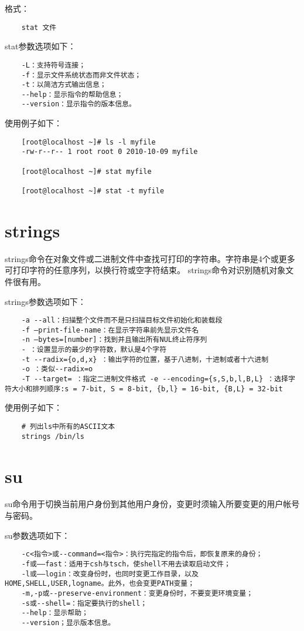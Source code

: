 \documentclass[a4paper,left=2.5cm,right=2.5cm,11pt]{article}
\begin{document}
	格式：
	\begin{lstlisting}
	stat 文件
	\end{lstlisting}

	stat参数选项如下：
	\begin{lstlisting}
	-L：支持符号连接； 
	-f：显示文件系统状态而非文件状态； 
	-t：以简洁方式输出信息； 
	--help：显示指令的帮助信息； 
	--version：显示指令的版本信息。
	\end{lstlisting}

	使用例子如下：
	\begin{lstlisting}
	[root@localhost ~]# ls -l myfile 
	-rw-r--r-- 1 root root 0 2010-10-09 myfile 

	[root@localhost ~]# stat myfile 
	
	[root@localhost ~]# stat -t myfile 
	\end{lstlisting}

\section{strings}
	strings命令在对象文件或二进制文件中查找可打印的字符串。字符串是4个或更多可打印字符的任意序列，以换行符或空字符结束。 strings命令对识别随机对象文件很有用。\par

	strings参数选项如下：
	\begin{lstlisting}
	-a --all：扫描整个文件而不是只扫描目标文件初始化和装载段 
	-f –print-file-name：在显示字符串前先显示文件名 
	-n –bytes=[number]：找到并且输出所有NUL终止符序列 
	- ：设置显示的最少的字符数，默认是4个字符 
	-t --radix={o,d,x} ：输出字符的位置，基于八进制，十进制或者十六进制 
	-o ：类似--radix=o 
	-T --target= ：指定二进制文件格式 -e --encoding={s,S,b,l,B,L} ：选择字符大小和排列顺序:s = 7-bit, S = 8-bit, {b,l} = 16-bit, {B,L} = 32-bit
	\end{lstlisting}

	使用例子如下：
	\begin{lstlisting}
	# 列出ls中所有的ASCII文本
	strings /bin/ls
	\end{lstlisting}

\section{su}
	su命令用于切换当前用户身份到其他用户身份，变更时须输入所要变更的用户帐号与密码。\par

	su参数选项如下：
	\begin{lstlisting}
	-c<指令>或--command=<指令>：执行完指定的指令后，即恢复原来的身份； 
	-f或——fast：适用于csh与tsch，使shell不用去读取启动文件； 
	-l或——login：改变身份时，也同时变更工作目录，以及HOME,SHELL,USER,logname。此外，也会变更PATH变量； 
	-m,-p或--preserve-environment：变更身份时，不要变更环境变量； 
	-s或--shell=：指定要执行的shell； 
	--help：显示帮助； 
	--version；显示版本信息。
	\end{lstlisting}
\end{document}

